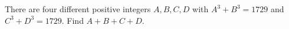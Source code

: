 There are four different positive integers $A,B,C,D$ with $A^3+B^3=1729$ and $C^3+D^3=1729$. Find $A+B+C+D$.
